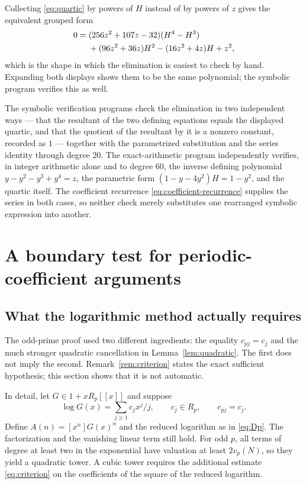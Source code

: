 \documentclass[11pt,a4paper]{article}
\numberwithin{equation}{section}
\theoremstyle{definition}
\theoremstyle{remark}
\begin{document}
Collecting \eqref{eq:quartic} by powers of $H$ instead of by powers of $z$
gives the equivalent grouped form
\begin{align}\label{eq:quartic-grouped}
 0={}&(256z^2+107z-32)(H^4-H^3)\notag\\
    &+(96z^2+36z)H^2-(16z^2+4z)H+z^2,
\end{align}
which is the shape in which the elimination is easiest to check by hand.
Expanding both displays shows them to be the same polynomial; the symbolic
program verifies this as well.

The symbolic verification programs check the elimination in two independent
ways --- that the resultant of the two defining equations equals the
displayed quartic, and that the quotient of the resultant by it is a nonzero
constant, recorded as $1$ --- together with the parametrized substitution and
the series identity through degree $20$. The exact-arithmetic program
independently verifies, in integer arithmetic alone and to degree $60$, the
inverse defining polynomial $y-y^2-y^3+y^4=z$, the parametric form
$(1-y-4y^2)H=1-y^2$, and the quartic itself. The coefficient recurrence
\eqref{eq:coefficient-recurrence} supplies the series in both cases, so
neither check merely substitutes one rearranged symbolic expression into
another.

\section{A boundary test for periodic-coefficient arguments}
\label{sec:boundary}

\subsection{What the logarithmic method actually requires}
The odd-prime proof used two different ingredients: the equality $c_{pj}=c_j$
and the much stronger quadratic cancellation in Lemma~\ref{lem:quadratic}.
The first does not imply the second. Remark~\ref{rem:criterion} states the
exact sufficient hypothesis; this section shows that it is not automatic.

In detail, let $G\in1+xR_p[[x]]$ and suppose
\[
 \log G(x)=\sum_{j\ge1}c_jx^j/j,\qquad c_j\in R_p,\qquad c_{pj}=c_j.
\]
Define $A(n)=[x^n]G(x)^n$ and the reduced logarithm as in \eqref{eq:Dp}. The
factorization and the vanishing linear term still hold. For odd $p$, all
terms of degree at least two in the exponential have valuation at least
$2v_p(N)$, so they yield a quadratic tower. A cubic tower requires the
additional estimate \eqref{eq:criterion} on the coefficients of the square
of the reduced logarithm.
\end{document}
